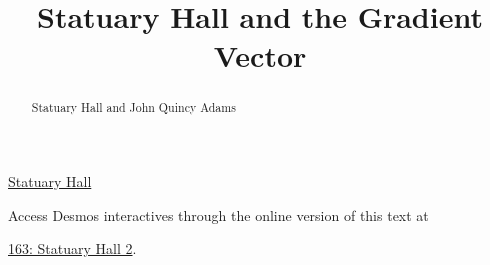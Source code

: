 \documentclass{ximera}
\title{Statuary Hall and the Gradient Vector}
\begin{document}
\begin{abstract}
Statuary Hall and John Quincy Adams
\end{abstract}
\maketitle


\begin{question}  \label{Q656g5y4546}

\begin{center}
\end{center}

\href{https://www.youtube.com/watch?v=FX6rUU_74kk}{Statuary Hall}



\begin{onlineOnly}
    \begin{center}
\end{center}
\end{onlineOnly}

Access Desmos interactives through the online version of this text at
 
\href{https://www.desmos.com/3d/3inyk1dxv4}{163: Statuary Hall 2}.

\end{question}
\end{document}
